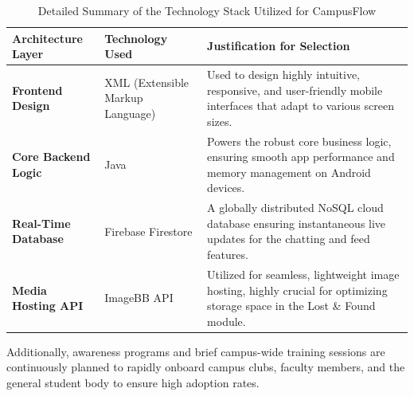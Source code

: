 \begin{table}[htbp]
\centering
\renewcommand{\arraystretch}{1.5}
\begin{tabular}{|p{}|p{}|p{}|}
\hline
\textbf{Architecture Layer} & \textbf{Technology Used} & \textbf{Justification for Selection} \\ \hline
\textbf{Frontend Design} & XML (Extensible Markup Language) & Used to design highly intuitive, responsive, and user-friendly mobile interfaces that adapt to various screen sizes. \\ \hline
\textbf{Core Backend Logic} & Java & Powers the robust core business logic, ensuring smooth app performance and memory management on Android devices. \\ \hline
\textbf{Real-Time Database} & Firebase Firestore & A globally distributed NoSQL cloud database ensuring instantaneous live updates for the chatting and feed features. \\ \hline
\textbf{Media Hosting API} & ImageBB API & Utilized for seamless, lightweight image hosting, highly crucial for optimizing storage space in the Lost \& Found module. \\ \hline
\end{tabular}
\caption{Detailed Summary of the Technology Stack Utilized for CampusFlow}
\label{tab:tech_stack}
\end{table}

Additionally, awareness programs and brief campus-wide training sessions are continuously planned to rapidly onboard campus clubs, faculty members, and the general student body to ensure high adoption rates.